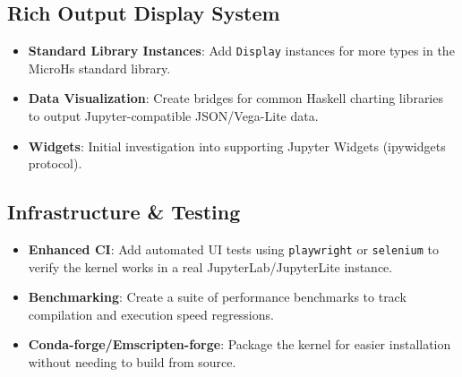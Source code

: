 \subsection{Rich Output Display System}


\begin{itemize}
\item [ ] \textbf{Standard Library Instances}: Add \texttt{Display} instances for more types in the MicroHs standard library.
\item [ ] \textbf{Data Visualization}: Create bridges for common Haskell charting libraries to output Jupyter-compatible JSON/Vega-Lite data.
\item [ ] \textbf{Widgets}: Initial investigation into supporting Jupyter Widgets (ipywidgets protocol).
\end{itemize}


\subsection{Infrastructure \& Testing}


\begin{itemize}
\item [ ] \textbf{Enhanced CI}: Add automated UI tests using \texttt{playwright} or \texttt{selenium} to verify the kernel works in a real JupyterLab/JupyterLite instance.
\item [ ] \textbf{Benchmarking}: Create a suite of performance benchmarks to track compilation and execution speed regressions.
\item [ ] \textbf{Conda-forge/Emscripten-forge}: Package the kernel for easier installation without needing to build from source.
\end{itemize}
